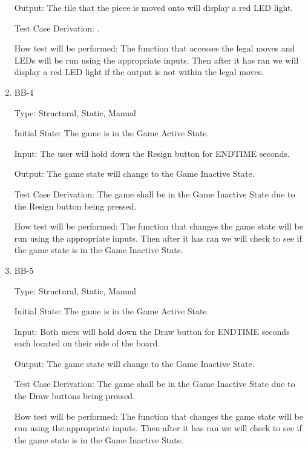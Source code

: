 \documentclass[12pt, titlepage]{article}
\begin{document}
\begin{enumerate}
    Output: The tile that the piece is moved onto will display a red LED
    light.
                        
    Test Case Derivation: .

    How test will be performed: The function that accesses the legal moves and LEDs will be run using the appropriate inputs.
    Then after it has ran we will display a red LED light if the output is not within the legal moves.  

    \item{BB-4\\}

    Type: Structural, Static, Manual
                      
    Initial State: The game is in the Game Active State.
                        
    Input: The user will hold down the Resign button for ENDTIME seconds.
                        
    Output: The game state will change to the Game Inactive State.
                        
    Test Case Derivation: The game shall be in the Game Inactive State due to the Resign button being pressed.
    
    How test will be performed: The function that changes the game state will be run using the appropriate inputs.
    Then after it has ran we will check to see if the game state is in the Game Inactive State.

    \item{BB-5\\}

    Type: Structural, Static, Manual
                      
    Initial State: The game is in the Game Active State.
                        
    Input: Both users will hold down the Draw button for ENDTIME seconds each located on their side of the board.
                        
    Output: The game state will change to the Game Inactive State.
                        
    Test Case Derivation: The game shall be in the Game Inactive State due to the Draw buttons being pressed.
    
    How test will be performed: The function that changes the game state will be run using the appropriate inputs.
    Then after it has ran we will check to see if the game state is in the Game Inactive State.


\end{enumerate}
\end{document}
